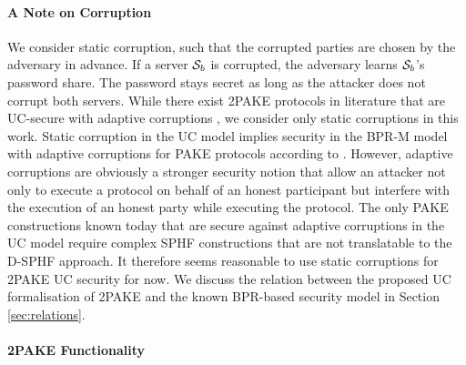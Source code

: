 \paragraph{A Note on Corruption}
We consider static corruption, such that the corrupted parties are chosen by the adversary in advance.
If a server $\mathcal{S}_b$ is corrupted, the adversary learns $\mathcal{S}_b$'s password share. 
The password stays secret as long as the attacker does not corrupt both servers.
While there exist \ac{2PAKE} protocols in literature that are \ac{UC}-secure with adaptive corruptions \cite{AbdallaBBCP13,AbdallaBP14a,AbdallaCCP09,AbdallaCP09}, we consider only static corruptions in this work.
Static corruption in the \ac{UC} model implies security in the \ac{BPR-M} model with adaptive corruptions for \ac{PAKE} protocols according to \citet{Canetti2005}.
However, adaptive corruptions are obviously a stronger security notion that allow an attacker not only to execute a protocol on behalf of an honest participant but interfere with the execution of an honest party while executing the protocol.
The only \ac{PAKE} constructions known today that are secure against adaptive corruptions in the \ac{UC} model require complex \ac{SPHF} constructions that are not translatable to the \ac{D-SPHF} approach.
It therefore seems reasonable to use static corruptions for \ac{2PAKE} \ac{UC} security for now.
We discuss the relation between the proposed \ac{UC} formalisation of \ac{2PAKE} and the known BPR-based security model in Section \ref{sec:relations}.

\paragraph{2PAKE Functionality}

